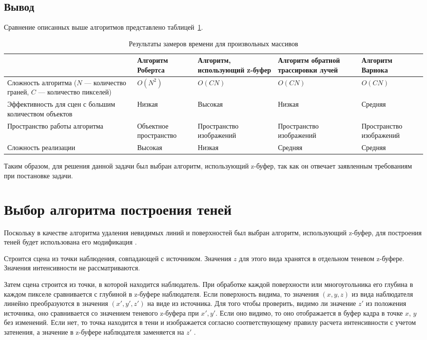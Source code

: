 \subsection*{Вывод}

Сравнение описанных выше алгоритмов представлено таблицей~\ref{tbl:alg}.

\begin{table}[H]
	\begin{center}
		\captionsetup{justification=raggedright, singlelinecheck=off}
		\caption{Результаты замеров времени для произвольных массивов}
		\label{tbl:alg}
			\begin{tabularx}{\textwidth}{|p{3.5cm}|p{2.5cm}|p{3cm}|p{3cm}|p{2.81cm}|}
				\hline
				& Алгоритм Робертса & Алгоритм, использующий z-буфер&Алгоритм обратной трассировки лучей &Алгоритм Варнока\\
				\hline
				Сложность алгоритма ($N$ --- количество граней, $C$ --- количество пикселей) & $O(N^2)$ &$O(CN)$ &$O(CN)$&$O(CN)$\\
				\hline
				Эффективность для сцен с большим количеством объектов &Низкая & Высокая&Низкая &Средняя\\
				\hline
				Пространство работы алгоритма &Объектное пространство &Пространство изображений & Пространство изображений& Пространство изображений\\
				\hline
				Сложность реализации &Высокая &Низкая & Средняя& Средняя\\
				\hline
			\end{tabularx}
	\end{center}
\end{table}

Таким образом, для решения данной задачи был выбран алгоритм, использующий z-буфер, так как он отвечает заявленным требованиям при постановке задачи.

\section{Выбор алгоритма построения теней}

Поскольку в качестве алгоритма удаления невидимых линий и поверхностей был выбран алгоритм, использующий z-буфер, для построения теней будет использована его модификация \cite{cg}. 

Строится сцена из точки наблюдения, совпадающей с источником. Значения $z$ для этого вида хранятся в отдельном теневом z-буфере. Значения интенсивности не рассматриваются.

Затем сцена строится из точки, в которой находится наблюдатель. При обработке каждой поверхности или многоугольника его глубина в каждом пикселе сравнивается с глубиной в z-буфере наблюдателя. Если поверхность видима, то значения $(x, y, z)$ из вида наблюдателя линейно преобразуются в значения $(x', y', z')$ на виде из источника. Для того чтобы проверить, видимо ли значение $z'$ из положения источника, оно сравнивается со значением теневого z-буфера при $x', y'$. Если оно видимо, то оно отображается в буфер кадра в точке $x$, $y$ без изменений. Если нет, то точка находится в тени и изображается согласно соответствующему правилу расчета интенсивности с учетом затенения, а значение в z-буфере наблюдателя заменяется на $z'$ \cite{zbufmoduf}\cite{shadows}.


